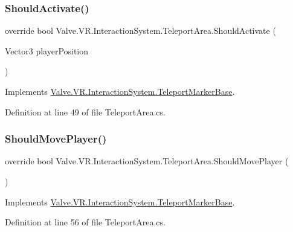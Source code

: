 \subsubsection{\texorpdfstring{ShouldActivate()}{ShouldActivate()}}
{\footnotesize\ttfamily override bool Valve.\+V\+R.\+Interaction\+System.\+Teleport\+Area.\+Should\+Activate (\begin{DoxyParamCaption}\item[{Vector3}]{player\+Position }\end{DoxyParamCaption})\hspace{0.3cm}{\ttfamily [virtual]}}



Implements \mbox{\hyperlink{class_valve_1_1_v_r_1_1_interaction_system_1_1_teleport_marker_base_a8c5bd9c4fad8bbfcd4cca509bd76e375}{Valve.\+V\+R.\+Interaction\+System.\+Teleport\+Marker\+Base}}.



Definition at line 49 of file Teleport\+Area.\+cs.

\mbox{\label{class_valve_1_1_v_r_1_1_interaction_system_1_1_teleport_area_ad2785af739ebe7063eb636f0c8978a8e}} 
\subsubsection{\texorpdfstring{ShouldMovePlayer()}{ShouldMovePlayer()}}
{\footnotesize\ttfamily override bool Valve.\+V\+R.\+Interaction\+System.\+Teleport\+Area.\+Should\+Move\+Player (\begin{DoxyParamCaption}{ }\end{DoxyParamCaption})\hspace{0.3cm}{\ttfamily [virtual]}}



Implements \mbox{\hyperlink{class_valve_1_1_v_r_1_1_interaction_system_1_1_teleport_marker_base_ae58e1036576aa8b913ad958bd294cd6f}{Valve.\+V\+R.\+Interaction\+System.\+Teleport\+Marker\+Base}}.



Definition at line 56 of file Teleport\+Area.\+cs.

\mbox{\label{class_valve_1_1_v_r_1_1_interaction_system_1_1_teleport_area_abf4db69deb14ee86ecc61a6580b8437f}} 
